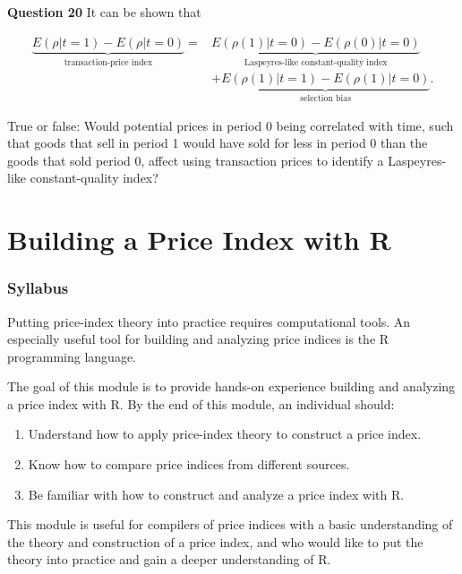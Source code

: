 \documentclass[]{article}
\providecommand{\tightlist}{%
  \setlength{\itemsep}{0pt}\setlength{\parskip}{0pt}}
\begin{document}
\textbf{Question 20} It can be shown that

\begin{align*}
\underbrace{E(\rho | t = 1) - E(\rho | t = 0)}_{\text{transaction-price index}} =& \underbrace{E(\rho(1) | t = 0) - E(\rho(0) | t = 0)}_{\text{Laspeyres-like constant-quality index}} \\ 
&+ \underbrace{E(\rho(1) | t = 1) - E(\rho(1) | t = 0)}_{\text{selection bias}}.
\end{align*}

True or false: Would potential prices in period 0 being correlated with time, such that goods that sell in period 1 would have sold for less in period 0 than the goods that sold period 0, affect using transaction prices to identify a Laspeyres-like constant-quality index?

\hypertarget{part-building-a-price-index-with-r}{%
\part{Building a Price Index with R}\label{part-building-a-price-index-with-r}}

\hypertarget{syllabus-3}{%
\section{Syllabus}\label{syllabus-3}}

Putting price-index theory into practice requires computational tools. An especially useful tool for building and analyzing price indices is the R programming language.

The goal of this module is to provide hands-on experience building and analyzing a price index with R. By the end of this module, an individual should:

\begin{enumerate}
\def\labelenumi{\arabic{enumi}.}
\tightlist
\item
  Understand how to apply price-index theory to construct a price index.
\item
  Know how to compare price indices from different sources.
\item
  Be familiar with how to construct and analyze a price index with R.
\end{enumerate}

This module is useful for compilers of price indices with a basic understanding of the theory and construction of a price index, and who would like to put the theory into practice and gain a deeper understanding of R.
\end{document}
